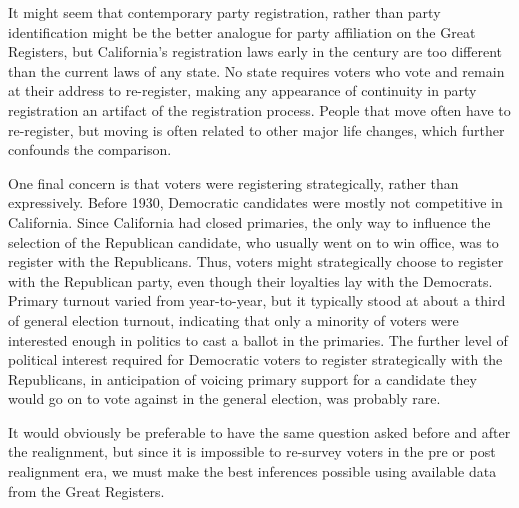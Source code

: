 \documentclass[11pt]{scrartcl}\usepackage[]{graphicx}\usepackage[]{color}
\begin{document}
It might seem that contemporary party registration,  rather than party identification might be the better analogue for party affiliation on the Great Registers, but California's registration laws early in the century are too different than the current laws of any state. No state requires voters who vote and remain at their address to re-register, making any appearance of continuity in party registration an artifact of the registration process. People that move often have to re-register, but moving is often related to other major life changes, which further confounds the comparison.  

One final concern is that voters were registering strategically, rather than expressively. Before 1930, Democratic candidates were mostly not competitive in California. Since California had closed primaries, the only way to influence the selection of the Republican candidate, who usually went on to win office, was to register with the Republicans. Thus, voters might strategically choose to register with the Republican party, even though their loyalties lay with the Democrats.  Primary turnout varied from year-to-year, but it typically stood at about a third of general election turnout, indicating that only a minority of voters were interested enough in politics to cast a ballot in the primaries. The further level of political interest required for Democratic voters to register strategically with the Republicans, in anticipation of voicing primary support for a candidate they would go on to vote against in the general election, was probably rare.

It would obviously be preferable to have the same question asked before and after the realignment,  but since it is impossible to re-survey voters in the pre or post realignment era, we must make the best inferences possible using available data from the Great Registers.




\FloatBarrier

\end{document}
